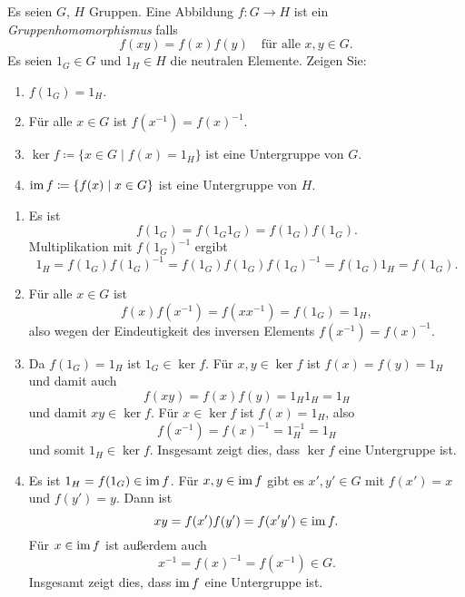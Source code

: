 \begin{question}
 Es seien $G$, $H$ Gruppen. Eine Abbildung $f \colon G \to H$ ist ein \emph{Gruppenhomomorphismus} falls
 \[
  f(xy) = f(x) f(y) \quad \text{für alle $x,y \in G$}.
 \]
 Es seien $1_G \in G$ und $1_H \in H$ die neutralen Elemente. Zeigen Sie:
 \begin{enumerate}
  \item
   $f(1_G) = 1_H$.
  \item
   Für alle $x \in G$ ist $f(x^{-1}) = f(x)^{-1}$.
  \item
   $\ker f \coloneqq \{x \in G \mid f(x) = 1_H\}$ ist eine Untergruppe von $G$.
  \item
   $\operatorname{im} f \coloneqq \{f(x) \mid x \in G\}$ ist eine Untergruppe von $H$.
 \end{enumerate}
\end{question}
\begin{solution}
 \begin{enumerate}
  \item
   Es ist
   \[
    f(1_G) = f(1_G 1_G) = f(1_G) f(1_G).
   \]
   Multiplikation mit $f(1_G)^{-1}$ ergibt
   \[
    1_H = f(1_G) f(1_G)^{-1} = f(1_G) f(1_G) f(1_G)^{-1} = f(1_G) 1_H = f(1_G).
   \]
  \item
   Für alle $x \in G$ ist
   \[
    f(x) f(x^{-1}) = f(x x^{-1}) = f(1_G) = 1_H,
   \]
   also wegen der Eindeutigkeit des inversen Elements $f(x^{-1}) = f(x)^{-1}$.
  \item
   Da $f(1_G) = 1_H$ ist $1_G \in \ker f$. Für $x, y \in \ker f$ ist $f(x) = f(y) = 1_H$ und damit auch
   \[
    f(xy) = f(x) f(y) = 1_H 1_H = 1_H
   \]
   und damit $xy \in \ker f$. Für $x \in \ker f$ ist $f(x) = 1_H$, also
   \[
    f(x^{-1}) = f(x)^{-1} = 1_H^{-1} = 1_H
   \]
   und somit $1_H \in \ker f$. Insgesamt zeigt dies, dass $\ker f$ eine Untergruppe ist.
  \item
   Es ist $1_H = f(1_G) \in \operatorname{im} f$. Für $x, y \in \operatorname{im} f$ gibt es $x', y' \in G$ mit $f(x') = x$ und $f(y') = y$. Dann ist
   \[
    xy = f(x') f(y') = f(x' y') \in \operatorname{im} f.
   \]
   Für $x \in \operatorname{im} f$ ist außerdem auch
   \[
    x^{-1} = f(x)^{-1} = f(x^{-1}) \in G.
   \]
   Insgesamt zeigt dies, dass $\operatorname{im} f$ eine Untergruppe ist.
 \end{enumerate}
\end{solution}


